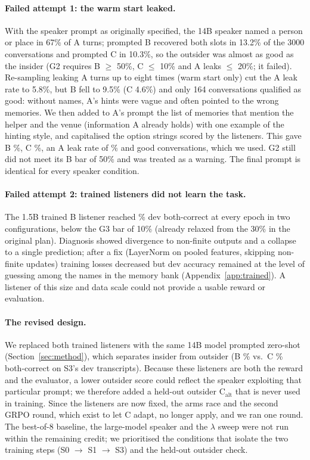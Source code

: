 \paragraph{Failed attempt 1: the warm start leaked.} With the speaker prompt as originally specified, the 14B speaker named a person or place in 67\% of A turns; prompted B recovered both slots in 13.2\% of the 3000 conversations and prompted C in 10.3\%, so the outsider was almost as good as the insider (G2 requires B $\ge$ 50\%, C $\le$ 10\% and A leaks $\le$ 20\%; it failed). Re-sampling leaking A turns up to eight times (warm start only) cut the A leak rate to 5.8\%, but B fell to 9.5\% (C 4.6\%) and only 164 conversations qualified as good: without names, A's hints were vague and often pointed to the wrong memories. We then added to A's prompt the list of memories that mention the helper and the venue (information A already holds) with one example of the hinting style, and capitalised the option strings scored by the listeners. This gave B \%, C \%, an A leak rate of \% and  good conversations, which we used. G2 still did not meet its B bar of 50\% and was treated as a warning. The final prompt is identical for every speaker condition.

\paragraph{Failed attempt 2: trained listeners did not learn the task.} The 1.5B trained B listener reached \% dev both-correct at every epoch in two configurations, below the G3 bar of 10\% (already relaxed from the 30\% in the original plan). Diagnosis showed divergence to non-finite outputs and a collapse to a single prediction; after a fix (LayerNorm on pooled features, skipping non-finite updates) training losses decreased but dev accuracy remained at the level of guessing among the names in the memory bank (Appendix~\ref{app:trained}). A listener of this size and data scale could not provide a usable reward or evaluation.

\paragraph{The revised design.} We replaced both trained listeners with the same 14B model prompted zero-shot (Section~\ref{sec:method}), which separates insider from outsider (B \% vs.\ C \% both-correct on S3's dev transcripts). Because these listeners are both the reward and the evaluator, a lower outsider score could reflect the speaker exploiting that particular prompt; we therefore added a held-out outsider C$_\text{alt}$ that is never used in training. Since the listeners are now fixed, the arms race and the second GRPO round, which exist to let C adapt, no longer apply, and we ran one round. The best-of-8 baseline, the large-model speaker and the $\lambda$ sweep were not run within the remaining credit; we prioritised the conditions that isolate the two training steps (S0 $\to$ S1 $\to$ S3) and the held-out outsider check.

